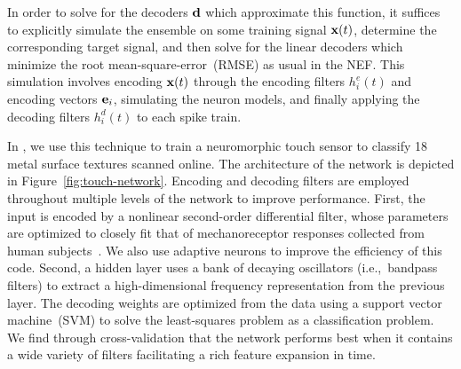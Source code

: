 
In order to solve for the decoders $\mathbf{d}$ which approximate this function, it suffices to explicitly simulate the ensemble on some training signal $\mathbf{x}(t)$, determine the corresponding target signal, and then solve for the linear decoders which minimize the root mean-square-error~(RMSE) as usual in the NEF.
This simulation involves encoding $\mathbf{x}(t)$ through the encoding filters $h_i^e(t)$ and encoding vectors $\mathbf{e}_i$, simulating the neuron models, and finally applying the decoding filters $h_i^d(t)$ to each spike train.

In \citet{voelker2016a}, we use this technique to train a neuromorphic touch sensor to classify 18 metal surface textures scanned online.
The architecture of the network is depicted in Figure~\ref{fig:touch-network}.
Encoding and decoding filters are employed throughout multiple levels of the network to improve performance.
First, the input is encoded by a nonlinear second-order differential filter, whose parameters are optimized to closely fit that of mechanoreceptor responses collected from human subjects~\citep{kim2010predicting}.
We also use adaptive neurons to improve the efficiency of this code.
Second, a hidden layer uses a bank of decaying oscillators (i.e.,~bandpass filters) to extract a high-dimensional frequency representation from the previous layer.
The decoding weights are optimized from the data using a support vector machine~(SVM) to solve the least-squares problem as a classification problem.
We find through cross-validation that the network performs best when it contains a wide variety of filters facilitating a rich feature expansion in time.


